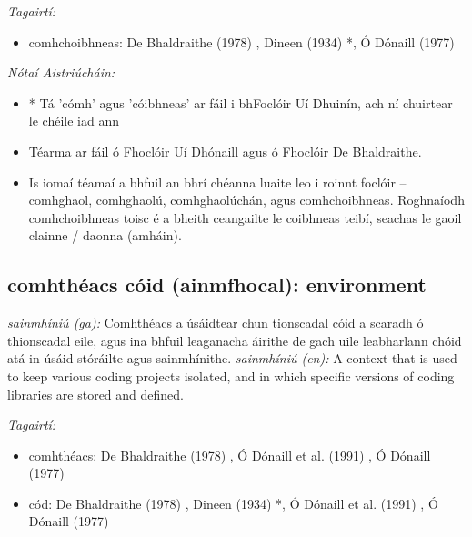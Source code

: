 \documentclass{article}
\begin{document}
 \noindent \textit{Tagairtí:}
\begin{itemize}
	\item comhchoibhneas: De Bhaldraithe (1978) \cite{de-bhaldraithe}, Dineen (1934) \cite{dineen}*, Ó Dónaill (1977) \cite{odonaill}
\end{itemize}

 \noindent \textit{Nótaí Aistriúcháin:}
\begin{itemize}
	\item * Tá 'cómh' agus 'cóibhneas' ar fáil i bhFoclóir Uí Dhuinín, ach ní chuirtear le chéile iad ann
	\item Téarma ar fáil ó Fhoclóir Uí Dhónaill agus ó Fhoclóir De Bhaldraithe.
	\item Is iomaí téamaí a bhfuil an bhrí chéanna luaite leo i roinnt foclóir -- comhghaol, comhghaolú, comhghaolúchán, agus comhchoibhneas. Roghnaíodh comhchoibhneas toisc é a bheith ceangailte le coibhneas teibí, seachas le gaoil clainne / daonna (amháin).
\end{itemize}


\subsection*{comhthéacs cóid (ainmfhocal): environment} 
 \noindent \textit{sainmhíniú (ga):} Comhthéacs a úsáidtear chun tionscadal cóid a scaradh ó thionscadal eile, agus ina bhfuil leaganacha áirithe de gach uile leabharlann chóid atá in úsáid stóráilte agus sainmhínithe.
\newline\newline
 \noindent \textit{sainmhíniú (en):} A context that is used to keep various coding projects isolated, and in which specific versions of coding libraries are stored and defined.
\newline

 \noindent \textit{Tagairtí:}
\begin{itemize}
	\item comhthéacs: De Bhaldraithe (1978) \cite{de-bhaldraithe}, Ó Dónaill et al. (1991) \cite{focloir-beag}, Ó Dónaill (1977) \cite{odonaill}
	\item cód: De Bhaldraithe (1978) \cite{de-bhaldraithe}, Dineen (1934) \cite{dineen}*, Ó Dónaill et al. (1991) \cite{focloir-beag}, Ó Dónaill (1977) \cite{odonaill}
\end{itemize}
\end{document}
